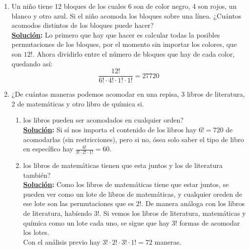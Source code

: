 \documentclass[11pt,letterpaper]{report}
\newcommand{\sol}{\textbf{\underline{Solución}: }} %
\begin{document}
\begin{enumerate}
\begin{enumerate}[label=\alph*)]
    \item Resuelve el ejercicio anterior de nuevo asumiendo que un número telefónico no puede
    iniciar con 911 ya que esta marcación esta reservada para emergencias\\
    \sol Por el princio de las casillas, si fijamos las tres primeras casillas con 9, 9 y 1,
    entonces quedan 4 casillas restantes con 10 opciones cada una, quedadando así que hay
    $10^4$ opciones de teléfonos que inician con 911, llamemos al experimento anterior
    $E$ con $\#E=10^4$. Por el inciso anterior tenemos a $F$ con $\#F = 8,000,000$, lo único
    que se debe de hacer es restarlos, teniendo así $\#F - \#E = 7,990,000$.

\end{enumerate}

\item Un niño tiene 12 bloques de los cuales 6 son de color negro, 4 son rojos, un blanco y otro azul.
Si el niño acomoda los bloques sobre una línea. ¿Cuántos acomodos distintos de los bloques puede hacer?\\
\sol Lo primero que hay que hacer es calcular todas la posibles permutaciones de los bloques,
por el momento sin importar los colores, que son $12!$. Ahora dividirlo entre el número de
bloques que hay de cada color, quedando así:
$$\frac{12!}{6! \cdot 4! \cdot 1! \cdot 1!} = 27720$$

\item ¿De cuántas maneras podemos acomodar en una repisa, 3 libros de literatura, 2 de matemáticas y 
otro libro de química si.
\begin{enumerate}[label=\alph*)]
    \item los libros pueden ser acomodados en cualquier orden?\\
    \sol Si sí nos importa el contenido de los libros hay $6! = 720$ de acomodarlas (sin
    restricciones), pero si no, ósea solo saber el tipo de libro en específico hay
    $\frac{6!}{3! \cdot 2! \cdot 1!} = 60$.

    \item los libros de matemáticas tienen que esta juntos y los de literatura también?\\
    \sol Como los libros de matemáticas tiene que estar juntos, se pueden ver como un lote de
    libros de matemáticas, y cualquier oreden de ese lote son las permutaciones que es $2!$.
    De manera análoga con los libros de literatura, habíendo $3!$.
    Si vemos los libros de literatura, matemáticas y química como un lote cada uno, 
    se sigue que hay $3!$ formas de acomodar los lotes.\\
    Con el análisis previo hay $3! \cdot 2! \cdot 3! \cdot 1! = 72$ maneras.


\end{enumerate}
\end{enumerate}
\end{document}
